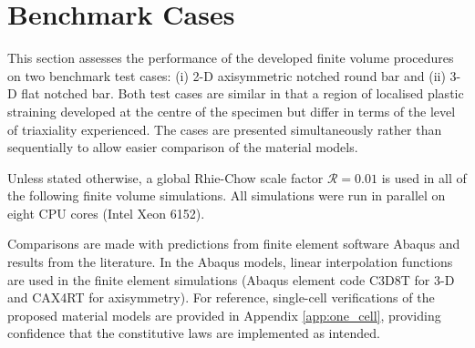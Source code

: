 \documentclass[sn-mathphys,Numbered,draft]{sn-jnl}%
\begin{document}
\section{Benchmark Cases} \label{sec:test_cases}

This section assesses the performance of the developed finite volume procedures on two benchmark test cases: (i) 2-D axisymmetric notched round bar and (ii) 3-D flat notched bar. %
Both test cases are similar in that a region of localised plastic straining developed at the centre of the specimen but differ in terms of the level of triaxiality experienced.
The cases are presented simultaneously rather than sequentially to allow easier comparison of the material models.

Unless stated otherwise, a global Rhie-Chow scale factor $\mathcal{R} = 0.01$ is used in all of the following finite volume simulations.
All simulations were run in parallel on eight CPU cores (Intel Xeon 6152).

Comparisons are made with predictions from finite element software Abaqus and results from the literature.
In the Abaqus models, linear interpolation functions are used in the finite element simulations (Abaqus element code C3D8T for 3-D and CAX4RT for axisymmetry).
For reference, single-cell verifications of the proposed material models are provided in Appendix \ref{app:one_cell}, providing confidence that the constitutive laws are implemented as intended.



\end{document}
